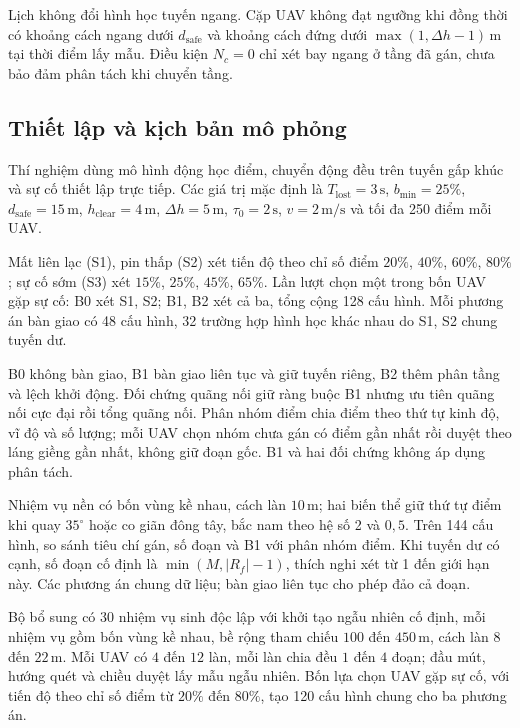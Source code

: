 \documentclass[11pt,a4paper]{article}
\newcommand{\Tlost}{T_{\mathrm{lost}}}
\newcommand{\dsaf}{d_{\mathrm{safe}}}
\newcommand{\bmin}{b_{\mathrm{min}}}
\newcommand{\Nc}{N_{c}}
\newcommand{\Dh}{\Delta h}
\newcommand{\tauzero}{\tau_{0}}
\begin{document}
Lịch không đổi hình học tuyến ngang. Cặp UAV không đạt ngưỡng khi đồng thời có khoảng cách ngang dưới $\dsaf$ và khoảng cách đứng dưới $\max(1,\Dh-1)\,\mathrm{m}$ tại thời điểm lấy mẫu. Điều kiện $\Nc=0$ chỉ xét bay ngang ở tầng đã gán, chưa bảo đảm phân tách khi chuyển tầng.

\FloatBarrier
\subsection{Thiết lập và kịch bản mô phỏng}

Thí nghiệm dùng mô hình động học điểm, chuyển động đều trên tuyến gấp khúc và sự cố thiết lập trực tiếp. Các giá trị mặc định là $\Tlost=3\,\mathrm{s}$, $\bmin=25\%$, $\dsaf=15\,\mathrm{m}$, $h_{\mathrm{clear}}=4\,\mathrm{m}$, $\Dh=5\,\mathrm{m}$, $\tauzero=2\,\mathrm{s}$, $v=2\,\mathrm{m/s}$ và tối đa 250 điểm mỗi UAV.

Mất liên lạc (S1), pin thấp (S2) xét tiến độ theo chỉ số điểm $20\%$, $40\%$, $60\%$, $80\%$; sự cố sớm (S3) xét $15\%$, $25\%$, $45\%$, $65\%$. Lần lượt chọn một trong bốn UAV gặp sự cố: B0 xét S1, S2; B1, B2 xét cả ba, tổng cộng 128 cấu hình. Mỗi phương án bàn giao có 48 cấu hình, 32 trường hợp hình học khác nhau do S1, S2 chung tuyến dư.

B0 không bàn giao, B1 bàn giao liên tục và giữ tuyến riêng, B2 thêm phân tầng và lệch khởi động. Đối chứng quãng nối giữ ràng buộc B1 nhưng ưu tiên quãng nối cực đại rồi tổng quãng nối. Phân nhóm điểm chia điểm theo thứ tự kinh độ, vĩ độ và số lượng; mỗi UAV chọn nhóm chưa gán có điểm gần nhất rồi duyệt theo láng giềng gần nhất, không giữ đoạn gốc. B1 và hai đối chứng không áp dụng phân tách.

Nhiệm vụ nền có bốn vùng kề nhau, cách làn $10\,\mathrm{m}$; hai biến thể giữ thứ tự điểm khi quay $35^\circ$ hoặc co giãn đông tây, bắc nam theo hệ số 2 và $0{,}5$. Trên 144 cấu hình, so sánh tiêu chí gán, số đoạn và B1 với phân nhóm điểm. Khi tuyến dư có cạnh, số đoạn cố định là $\min(M,|R_f|-1)$, thích nghi xét từ 1 đến giới hạn này. Các phương án chung dữ liệu; bàn giao liên tục cho phép đảo cả đoạn.

Bộ bổ sung có 30 nhiệm vụ sinh độc lập với khởi tạo ngẫu nhiên cố định, mỗi nhiệm vụ gồm bốn vùng kề nhau, bề rộng tham chiếu $100$ đến $450\,\mathrm{m}$, cách làn $8$ đến $22\,\mathrm{m}$. Mỗi UAV có $4$ đến $12$ làn, mỗi làn chia đều $1$ đến $4$ đoạn; đầu mút, hướng quét và chiều duyệt lấy mẫu ngẫu nhiên. Bốn lựa chọn UAV gặp sự cố, với tiến độ theo chỉ số điểm từ $20\%$ đến $80\%$, tạo 120 cấu hình chung cho ba phương án.
\end{document}
